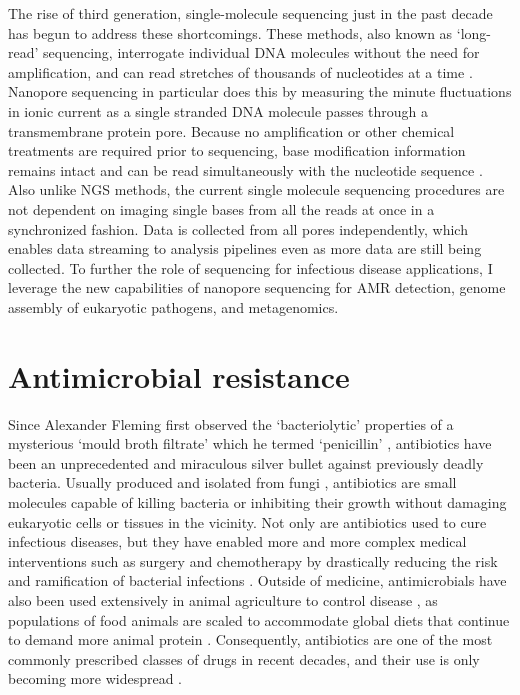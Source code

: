 The rise of third generation, single-molecule sequencing just in the past decade has begun to address these shortcomings. These methods, also known as ‘long-read’ sequencing, interrogate individual DNA molecules without the need for amplification, and can read stretches of thousands of nucleotides at a time \citep{Jain2018-qp}. Nanopore sequencing in particular does this by measuring the minute fluctuations in ionic current as a single stranded DNA molecule passes through a transmembrane protein pore. Because no amplification or other chemical treatments are required prior to sequencing, base modification information remains intact and can be read simultaneously with the nucleotide sequence \citep{Simpson2017-wb, McIntyre2017-ed}. Also unlike NGS methods, the current single molecule sequencing procedures are not dependent on imaging single bases from all the reads at once in a synchronized fashion. Data is collected from all pores independently, which enables data streaming to analysis pipelines even as more data are still being collected. To further the role of sequencing for infectious disease applications, I leverage the new capabilities of nanopore sequencing for AMR detection, genome assembly of eukaryotic pathogens, and metagenomics.

\section{Antimicrobial resistance}
\label{sec:amr}
Since Alexander Fleming first observed the ‘bacteriolytic’ properties of a mysterious ‘mould broth filtrate’ which he termed ‘penicillin’ \citep{Fleming1929-cb}, antibiotics have been an unprecedented and miraculous silver bullet against previously deadly bacteria. Usually produced and isolated from fungi \citep{Martinez2008-cf}, antibiotics are small molecules capable of killing bacteria or inhibiting their growth without damaging eukaryotic cells or tissues in the vicinity. Not only are antibiotics used to cure infectious diseases, but they have enabled more and more complex medical interventions such as surgery and chemotherapy by drastically reducing the risk and ramification of bacterial infections \citep{Crofts2017-ni}. Outside of medicine, antimicrobials have also been used extensively in animal agriculture to control disease \citep{Aarestrup2015-zu}, as populations of food animals are scaled to accommodate global diets that continue to demand more animal protein \citep{Van_Boeckel2019-zl}. Consequently, antibiotics are one of the most commonly prescribed classes of drugs in recent decades, and their use is only becoming more widespread \citep{Van_Boeckel2014-io}.

